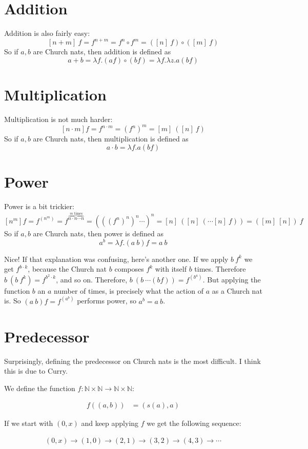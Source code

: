 \documentclass[a4paper, 11pt]{article}
\newcommand{\N}{\mathbb{N}}
\theoremstyle{definition}
\begin{document}
\section*{Addition}
Addition is also fairly easy:
\[
  [n+m]\ f = f^{n+m} = f^n \circ f^m = ([n]\ f) \circ ([m]\ f)
\]
So if $a,b$ are Church nats, then addition is defined as
\[
  a + b = \lambda f. (a f) \circ (b f) = \lambda f. \lambda z. a (b f)
\]

\section*{Multiplication}
Multiplication is not much harder:
\[
  [n\cdot m] f = f^{n\cdot m} = (f^n)^m = [m]\ ([n]\ f)
\]
So if $a,b$ are Church nats, then multiplication is defined as
\[
  a \cdot b = \lambda f. a (b f)
\]


\section*{Power}
Power is a bit trickier:
\[
  [n^m] f = f^{(n^m)} = f^{\overbrace{n\cdot n \cdots n}^{m\text{ times}}} = (((f^n)^n)^n \cdots)^n = [n]\ ([n]\ (\cdots [n]\ f)) = ([m]\ [n])\ f
\]
So if $a,b$ are Church nats, then power is defined as
\[
  a^b = \lambda f. (a\ b) f = a\ b
\]

Nice! If that explanation was confusing, here's another one. If we apply $b\ f^k$ we get $f^{b\cdot k}$, because the Church nat $b$ composes $f^k$ with itself $b$ times. Therefore $b\ (b\ f^k) = f^{b^2 \cdot k}$, and so on. Therefore, $b\ (b\ \cdots (b f)) = f^{(b^a)}$. But applying the function $b$ an $a$ number of times, is precisely what the action of $a$ as a Church nat is. So $(a\ b) f = f^{(a^b)}$ performs power, so $a^b = a\ b$.

\section*{Predecessor}
Surprisingly, defining the predecessor on Church nats is the most difficult. I think this is due to Curry.

We define the function $f : \N \times \N \to \N \times \N$:

\begin{align*}
  f((a,b)) &= (s(a),a)
\end{align*}

If we start with $(0,x)$ and keep applying $f$ we get the following sequence:

\begin{align*}
  (0,x) \to (1,0) \to (2,1) \to (3,2) \to (4,3) \to \cdots
\end{align*}
\end{document}

